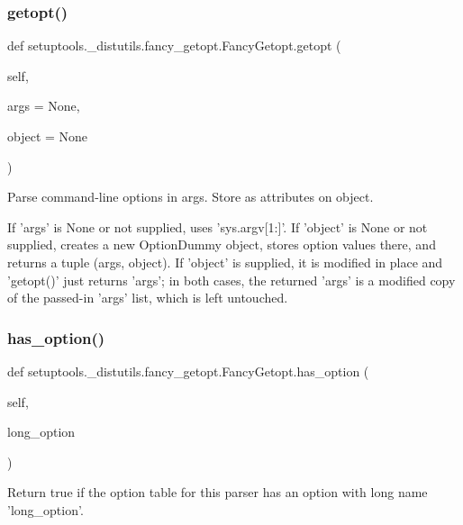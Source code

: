 \subsubsection{\texorpdfstring{getopt()}{getopt()}}
{\footnotesize\ttfamily def setuptools.\+\_\+distutils.\+fancy\+\_\+getopt.\+Fancy\+Getopt.\+getopt (\begin{DoxyParamCaption}\item[{}]{self,  }\item[{}]{args = {\ttfamily None},  }\item[{}]{object = {\ttfamily None} }\end{DoxyParamCaption})}

\begin{DoxyVerb}Parse command-line options in args. Store as attributes on object.

If 'args' is None or not supplied, uses 'sys.argv[1:]'.  If
'object' is None or not supplied, creates a new OptionDummy
object, stores option values there, and returns a tuple (args,
object).  If 'object' is supplied, it is modified in place and
'getopt()' just returns 'args'; in both cases, the returned
'args' is a modified copy of the passed-in 'args' list, which
is left untouched.
\end{DoxyVerb}
 \mbox{\label{classsetuptools_1_1__distutils_1_1fancy__getopt_1_1FancyGetopt_a315138d5b201f19a34aeb424f73f6489}} 
\subsubsection{\texorpdfstring{has\+\_\+option()}{has\_option()}}
{\footnotesize\ttfamily def setuptools.\+\_\+distutils.\+fancy\+\_\+getopt.\+Fancy\+Getopt.\+has\+\_\+option (\begin{DoxyParamCaption}\item[{}]{self,  }\item[{}]{long\+\_\+option }\end{DoxyParamCaption})}

\begin{DoxyVerb}Return true if the option table for this parser has an
option with long name 'long_option'.\end{DoxyVerb}
 \mbox{\label{classsetuptools_1_1__distutils_1_1fancy__getopt_1_1FancyGetopt_a1af95984a750e91da487a6cd0aecd5c8}} 
